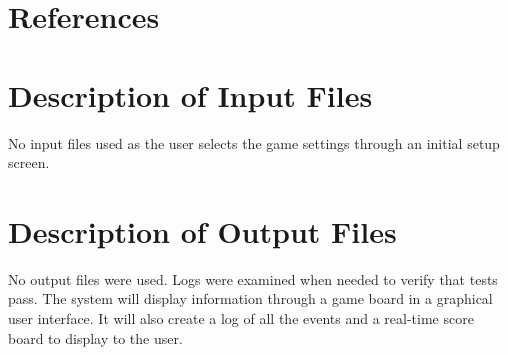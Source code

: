 \documentclass[12pt]{article}
\begin{document}
\begin{itemize}





\end{itemize}


\section{References}
 
%

\appendix

\section{Description of Input Files}

No input files used as the user selects the game settings through an initial setup screen.

\section{Description of Output Files}

No output files were used. Logs were examined when needed to verify that tests pass. The system will display information through a game board in a graphical user interface. It will also create a log of all the events and a real-time score board to display to the user.
\end{document}
